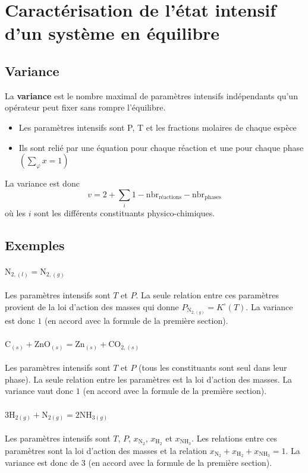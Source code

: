 \documentclass[french]{book}
\theoremstyle{plain}
\theoremstyle{definition}
\theoremstyle{remark}
\begin{document}
\section{Caractérisation de l'état intensif d'un système en équilibre}
\subsection{Variance}
La \textbf{variance} est le nombre maximal de paramètres intensifs indépendants qu'un opérateur peut fixer sans rompre l'équilibre.
\begin{itemize}
	\item Les paramètres intensifs sont P, T et les fractions molaires de chaque espèce
	\item Ils sont relié par une équation pour chaque réaction et une pour chaque phase $\left(\displaystyle\sum_\varphi x=1\right)$
\end{itemize}
La variance est donc $$v=2+\sum_i 1-\text{nbr}_\text{réactions}-\text{nbr}_\text{phases}$$ où les $i$ sont les différents constituants physico-chimiques.
\subsection{Exemples}
\paragraph{$\text{N}_{2,(l)}=\text{N}_{2,(g)}$} Les paramètres intensifs sont $T$ et $P$. La seule relation entre ces paramètres provient de la loi d'action des masses qui donne $P_{\text{N}_{2,(g)}}=K^\circ(T)$. La variance est donc $1$ (en accord avec la formule de la première section). 
\paragraph{$\text{C}_{(s)}+\text{ZnO}_{(s)}=\text{Zn}_{(s)}+\text{CO}_{2,(s)}$}
Les paramètres intensifs sont $T$ et $P$ (tous les constituants sont seul dans leur phase). La seule relation entre les paramètres est la loi d'action des masses. La variance vaut donc $1$ (en accord avec la formule de la première section).
\paragraph{$3\text{H}_{2(g)}+\text{N}_{2(g)}=2\text{NH}_{3(g)}$} Les paramètres intensifs sont $T$, $P$, $x_{\text{N}_2}$, $x_{\text{H}_2}$ et $x_{\text{NH}_3}$. Les relations entre ces paramètres sont la loi d'action des masses et la relation $x_{\text{N}_2}+x_{\text{H}_2}+x_{\text{NH}_3}=1$. La variance est donc de $3$ (en accord avec la formule de la première section).
\end{document}
